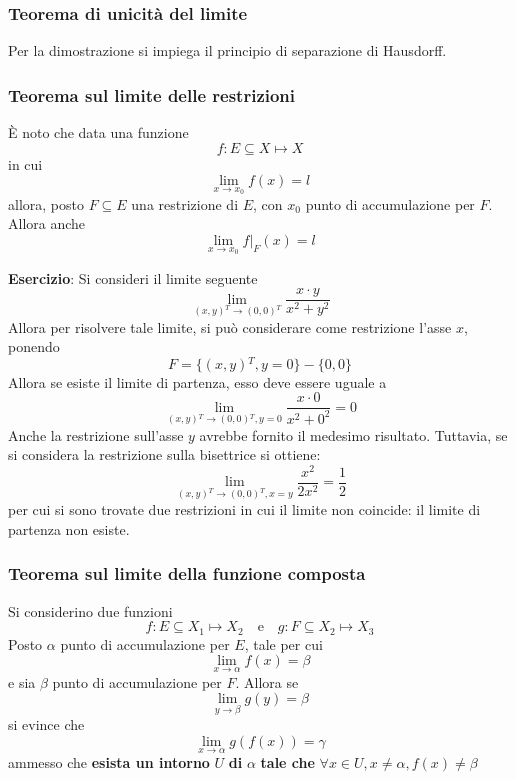 \documentclass[a4paper]{extarticle}
\begin{document}
\vspace{1em}
\noindent
\subsubsection{Teorema di unicità del limite}
Per la dimostrazione si impiega il principio di separazione di Hausdorff.

\vspace{1em}
\noindent
\subsubsection{Teorema sul limite delle restrizioni}
È noto che data una funzione
\[f : E \subseteq X \longmapsto X\]
in cui
\[\lim_{x \to x_0} f(x) = l\]
allora, posto $F \subseteq E$ una restrizione di $E$, con $x_0$ punto di accumulazione per $F$. Allora anche
\[\lim_{x \to x_0} f\vert_F(x)=l\]

\vspace{2em}
\noindent
\textbf{Esercizio}: Si consideri il limite seguente
\[\lim_{(x,y){^T} \to (0,0){^T}} \frac{x \cdot y}{x^2 + y^2}\]
Allora per risolvere tale limite, si può considerare come restrizione l'asse $x$, ponendo
\[F = \{(x,y){^T}, y=0\} - \{0,0\}\]
Allora se esiste il limite di partenza, esso deve essere uguale a
\[\lim_{(x,y){^T} \to (0,0){^T}, y=0} \frac{x \cdot 0}{x^2 + 0^2} = 0\]
Anche la restrizione sull'asse $y$ avrebbe fornito il medesimo risultato. Tuttavia, se si considera la restrizione sulla bisettrice si ottiene:
\[\lim_{(x,y){^T} \to (0,0){^T}, x=y} \frac{x^2}{2x^2} = \frac{1}{2}\]
per cui si sono trovate due restrizioni in cui il limite non coincide: il limite di partenza non esiste.

\vspace{1em}
\noindent
\subsubsection{Teorema sul limite della funzione composta}
Si considerino due funzioni
\[f : E \subseteq X_1 \longmapsto X_2 \hspace{1em} \text{e} \hspace{1em} g : F \subseteq X_2 \longmapsto X_3\]
Posto $\alpha$ punto di accumulazione per $E$, tale per cui
\[\lim_{x \to \alpha} f(x) = \beta\]
e sia $\beta$ punto di accumulazione per $F$. Allora se
\[\lim_{y \to \beta} g(y) = \beta\]
si evince che
\[\lim_{x \to \alpha} g(f(x)) = \gamma\]
ammesso che \textbf{esista un intorno } $U$ \textbf{ di } $\alpha$ \textbf{ tale che } $\forall x \in U, x \neq \alpha, f(x) \neq \beta$
\end{document}
